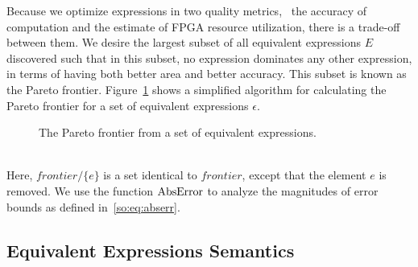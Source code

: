Because we optimize expressions in two quality metrics, \ie~the accuracy of
computation and the estimate of FPGA resource utilization, there is a trade-off
between them. We desire the largest subset of all equivalent expressions
$E$ discovered such that in this subset, no expression dominates any other
expression, in terms of having both better area and better accuracy. This
subset is known as the Pareto frontier.  Figure~\ref{so:alg:pareto} shows
a simplified algorithm for calculating the Pareto frontier for a set of
equivalent expressions $\epsilon$.
\begin{figure}[ht]
    \centering
    \begin{algorithmic}
                    \EndIf{}
                \EndFor{}
            \EndFor{}
        \EndFunction%
    \end{algorithmic}
    \caption{The Pareto frontier from a set of equivalent expressions.
    }\label{so:alg:pareto}
\end{figure} \\
Here, $\mathit{frontier} / \{ e \}$ is a set identical to $\mathit{frontier}$,
except that the element $e$ is removed.  We use the function $\operatorname{\mathrm{AbsError}}$ to
analyze the magnitudes of error bounds as defined in~\eqref{so:eq:abserr}.


\subsection{Equivalent Expressions Semantics}

